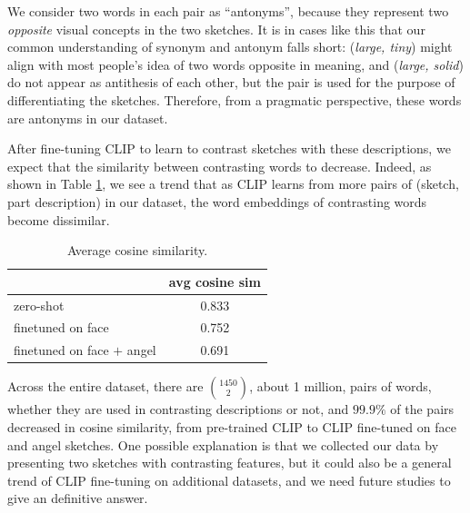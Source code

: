 We consider two words in each pair as ``antonyms'', because they represent two \textit{opposite} visual concepts in the two sketches.   
It is in cases like this that our common understanding of synonym and antonym falls short: (\textit{large, tiny}) might align with most people's idea of two words opposite in meaning, and (\textit{large, solid}) do not appear as antithesis of each other, but the pair is used for the purpose of differentiating the sketches. Therefore, from a pragmatic perspective, these words are antonyms in our dataset. 

After fine-tuning CLIP to learn to contrast sketches with these descriptions, we expect that the similarity between contrasting words to decrease. Indeed, as shown in Table \ref{results.wordsim}, we see a trend that as CLIP learns from more pairs of (sketch, part description) in our dataset, the word embeddings of contrasting words become dissimilar.

\begin{table}[h!]
\begin{minipage}{1\textwidth}
\begin{center}
{\small
\begin{tabular}{l|c}
\toprule
~ & avg cosine sim \\
\midrule 
zero-shot & 0.833 \\
finetuned on face & 0.752 \\
finetuned on face $+$ angel & 0.691 \\
\bottomrule
\end{tabular}}
\caption{Average cosine similarity.}
\label{results.wordsim}
\end{center}
\end{minipage} 
\end{table}

Across the entire dataset, there are $\binom{1450}{2}$, about 1 million, pairs of words, whether they are used in contrasting descriptions or not, and $99.9\%$ of the pairs decreased in cosine similarity, from pre-trained CLIP to CLIP fine-tuned on face and angel sketches. One possible explanation is that we collected our data by presenting two sketches with contrasting features, but it could also be a general trend of CLIP fine-tuning on additional datasets, and we need future studies to give an definitive answer.

